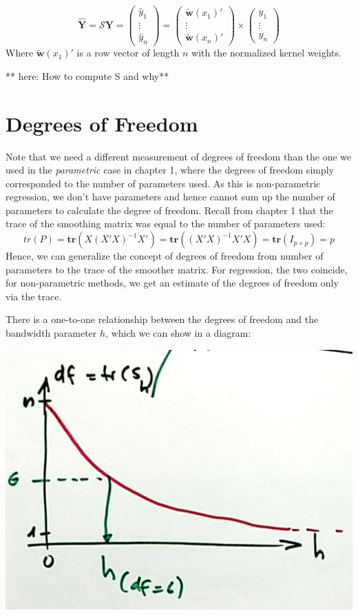 \documentclass[]{book}
\begin{document}
\[\mathbf{\hat{Y}} = \mathcal{S} \mathbf{Y} = 
\begin{pmatrix}\hat{y}_1 \\\vdots\\\hat{y}_n\end{pmatrix} =
\begin{pmatrix}\tilde{\mathbf{w}}(x_1)'\\\vdots\\\tilde{\mathbf{w}}(x_n)'\end{pmatrix} 
\times \begin{pmatrix}y_1 \\\vdots\\y_n\end{pmatrix}\] Where
\(\tilde{\mathbf{w}}(x_1)'\) is a row vector of length \(n\) with the
normalized kernel weights.

** here: How to compute S and why**

\section{Degrees of Freedom}\label{degrees-of-freedom}

Note that we need a different measurement of degrees of freedom than the
one we used in the \emph{parametric} case in chapter 1, where the
degrees of freedom simply corresponded to the number of parameters used.
As this is non-parametric regression, we don't have parameters and hence
cannot sum up the number of parameters to calculate the degree of
freedom. Recall from chapter 1 that the trace of the smoothing matrix
was equal to the number of parameters used:
\[tr(P) = \textbf{tr}(X(X'X)^{-1}X') = \textbf{tr}((X'X)^{-1}X'X) = \textbf{tr}(I_{p\times p}) = p\]
Hence, we can generalize the concept of degrees of freedom from number
of parameters to the trace of the smoother matrix. For regression, the
two coincide, for non-parametric methods, we get an estimate of the
degrees of freedom only via the trace.

There is a one-to-one relationship between the degrees of freedom and
the bandwidth parameter \(h\), which we can show in a diagram:

\includegraphics[width=650px]{figures/relationship-h-df}
\end{document}
